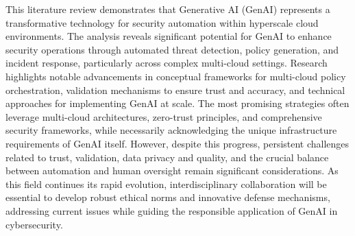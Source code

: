 This literature review demonstrates that Generative AI (GenAI) represents a transformative technology for security automation within hyperscale cloud environments. The analysis reveals significant potential for GenAI to enhance security operations through automated threat detection, policy generation, and incident response, particularly across complex multi-cloud settings. Research highlights notable advancements in conceptual frameworks for multi-cloud policy orchestration, validation mechanisms to ensure trust and accuracy, and technical approaches for implementing GenAI at scale. The most promising strategies often leverage multi-cloud architectures, zero-trust principles, and comprehensive security frameworks, while necessarily acknowledging the unique infrastructure requirements of GenAI itself. However, despite this progress, persistent challenges related to trust, validation, data privacy and quality, and the crucial balance between automation and human oversight remain significant considerations. As this field continues its rapid evolution, interdisciplinary collaboration will be essential to develop robust ethical norms and innovative defense mechanisms, addressing current issues while guiding the responsible application of GenAI in cybersecurity.


